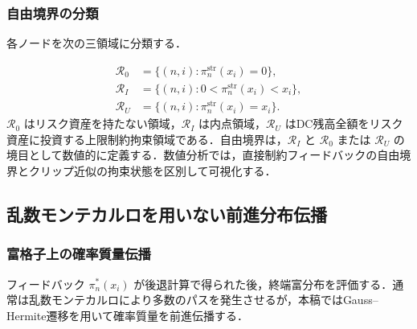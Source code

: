 \documentclass[10pt,a4paper]{article}
\theoremstyle{plain}
\theoremstyle{definition}
\begin{document}
\subsubsection{自由境界の分類}

各ノードを次の三領域に分類する．

\begin{align}
  \mathcal R_0&=\{(n,i):\pi_n^{\mathrm{str}}(x_i)=0\},\label{eq:R0}\\
  \mathcal R_I&=\{(n,i):0<\pi_n^{\mathrm{str}}(x_i)<x_i\},\label{eq:RI}\\
  \mathcal R_U&=\{(n,i):\pi_n^{\mathrm{str}}(x_i)=x_i\}.\label{eq:RU}
\end{align}
$\mathcal R_0$ はリスク資産を持たない領域，$\mathcal R_I$ は内点領域，$\mathcal R_U$ はDC残高全額をリスク資産に投資する上限制約拘束領域である．自由境界は，$\mathcal R_I$ と $\mathcal R_0$ または $\mathcal R_U$ の境目として数値的に定義する．数値分析では，直接制約フィードバックの自由境界とクリップ近似の拘束状態を区別して可視化する．

\subsection{乱数モンテカルロを用いない前進分布伝播}
\label{sec:forward}

\subsubsection{富格子上の確率質量伝播}

フィードバック $\pi_n^*(x_i)$ が後退計算で得られた後，終端富分布を評価する．通常は乱数モンテカルロにより多数のパスを発生させるが，本稿ではGauss--Hermite遷移を用いて確率質量を前進伝播する．
\end{document}
